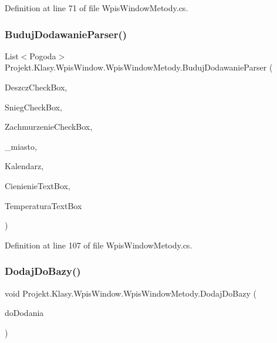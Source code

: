 Definition at line 71 of file Wpis\+Window\+Metody.\+cs.

\mbox{\label{class_projekt_1_1_klasy_1_1_wpis_window_1_1_wpis_window_metody_a8860fc9dd75fb6aae85ee31f61eedf81}} 
\subsubsection{\texorpdfstring{BudujDodawanieParser()}{BudujDodawanieParser()}\hspace{0.1cm}{\footnotesize\ttfamily [2/2]}}
{\footnotesize\ttfamily List$<$Pogoda$>$ Projekt.\+Klasy.\+Wpis\+Window.\+Wpis\+Window\+Metody.\+Buduj\+Dodawanie\+Parser (\begin{DoxyParamCaption}\item[{Check\+Box}]{Deszcz\+Check\+Box,  }\item[{Check\+Box}]{Snieg\+Check\+Box,  }\item[{Check\+Box}]{Zachmurzenie\+Check\+Box,  }\item[{string}]{\+\_\+miasto,  }\item[{Calendar}]{Kalendarz,  }\item[{Text\+Box}]{Cienienie\+Text\+Box,  }\item[{Text\+Box}]{Temperatura\+Text\+Box }\end{DoxyParamCaption})}



Definition at line 107 of file Wpis\+Window\+Metody.\+cs.

\mbox{\label{class_projekt_1_1_klasy_1_1_wpis_window_1_1_wpis_window_metody_a011d0008b8ca845eff27f2b90629c17d}} 
\subsubsection{\texorpdfstring{DodajDoBazy()}{DodajDoBazy()}}
{\footnotesize\ttfamily void Projekt.\+Klasy.\+Wpis\+Window.\+Wpis\+Window\+Metody.\+Dodaj\+Do\+Bazy (\begin{DoxyParamCaption}\item[{List$<$ Pogoda $>$}]{do\+Dodania }\end{DoxyParamCaption})}



